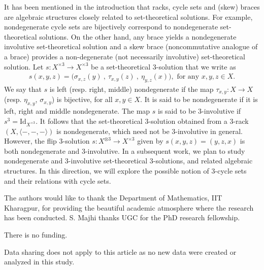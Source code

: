 \documentclass[a4paper,reqno,10pt]{amsart}
\theoremstyle{plain}
\theoremstyle{definition}
\theoremstyle{remark}
\begin{document}
\medskip

It has been mentioned in the introduction that racks, cycle sets and (skew) braces are algebraic structures closely related to set-theoretical solutions. For example, nondegenerate cycle sets are bijectively correspond to nondegenerate set-theoretical solutions. On the other hand, any brace yields a nondegenerate involutive set-theoretical solution and a skew brace (noncommutative analogue of a brace) provides a non-degenerate (not necessarily involutive) set-theoretical solution. Let $s : X^{\times 3} \rightarrow X^{\times 3}$ be a set-theoretical $3$-solution that we write as
\begin{align*}
    s (x, y, z)= \big(   \sigma_{x, z} (y) ~ \! , ~ \! \tau_{x, y} (z)~\! , ~ \! \eta_{y, z} (x)  \big), \text{ for any } x, y, z \in X.
\end{align*}
We say that $s$ is left (resp. right, middle) nondegenerate if the map $\tau_{x, y}: X \rightarrow X$ (resp. $\eta_{x, y}$, $\sigma_{x, y}$) is bijective, for all $x, y \in X$. It is said to be nondegenerate if it is left, right and middle nondegenerate. The map $s$ is said to be $3$-involutive if $s^3 = \mathrm{Id}_{X^{\times 3}}$. It follows that the set-theoretical $3$-solution obtained from a $3$-rack $(X, \langle -, -, - \rangle)$ is nondegenerate, which need not be $3$-involutive in general. However, the flip $3$-solution $s : X^{\otimes 3} \rightarrow X^{\times 3}$ given by $s (x, y, z) = (y, z, x)$ is both nondegenerate and $3$-involutive. In a subsequent work, we plan to study nondegenerate and $3$-involutive set-theoretical $3$-solutions, and related algebraic structures. In this direction, we will explore the possible notion of $3$-cycle sets and their relations with cycle sets.

\medskip
    
 The authors would like to thank the Department of Mathematics, IIT Kharagpur, for providing the beautiful academic atmosphere where the research has been conducted. S. Majhi thanks UGC for the PhD research fellowship.

\medskip

 There is no funding.

\medskip

 Data sharing does not apply to this article as no new data were created or analyzed in this study.
    
\end{document}
